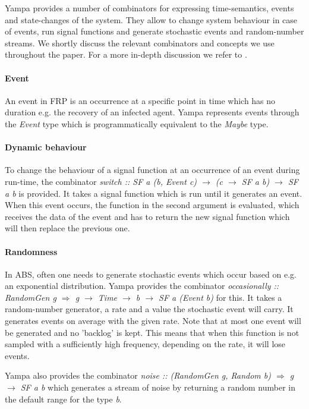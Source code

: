 Yampa provides a number of combinators for expressing time-semantics, events and state-changes of the system. They allow to change system behaviour in case of events, run signal functions and generate stochastic events and random-number streams. We shortly discuss the relevant combinators and concepts we use throughout the paper. For a more in-depth discussion we refer to \cite{hudak_arrows_2003, courtney_yampa_2003, nilsson_functional_2002}.

\paragraph{Event}
An event in FRP is an occurrence at a specific point in time which has no duration e.g. the recovery of an infected agent. Yampa represents events through the \textit{Event} type which is programmatically equivalent to the \textit{Maybe} type. 

\paragraph{Dynamic behaviour}
To change the behaviour of a signal function at an occurrence of an event during run-time, the combinator \textit{switch :: SF a (b, Event c) $\rightarrow$ (c $\rightarrow$ SF a b) $\rightarrow$ SF a b} is provided. It takes a signal function which is run until it generates an event. When this event occurs, the function in the second argument is evaluated, which receives the data of the event and has to return the new signal function which will then replace the previous one.

\paragraph{Randomness}
In ABS, often one needs to generate stochastic events which occur based on e.g. an exponential distribution. Yampa provides the combinator \textit{occasionally :: RandomGen g $\Rightarrow$ g $\rightarrow$ Time $\rightarrow$ b $\rightarrow$ SF a (Event b)} for this. It takes a random-number generator, a rate and a value the stochastic event will carry. It generates events on average with the given rate. Note that at most one event will be generated and no 'backlog' is kept. This means that when this function is not sampled with a sufficiently high frequency, depending on the rate, it will lose events.

Yampa also provides the combinator \textit{noise :: (RandomGen g, Random b) $\Rightarrow$ g $\rightarrow$ SF a b} which generates a stream of noise by returning a random number in the default range for the type \textit{b}.

